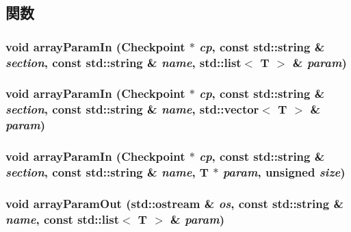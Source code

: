 \subsection{関数}
\hypertarget{serialize_8hh_ae46dcc0ec3ac204a89456a1aad4c9527}{
\subsubsection[{arrayParamIn}]{\setlength{\rightskip}{0pt plus 5cm}void arrayParamIn ({\bf Checkpoint} $\ast$ {\em cp}, \/  const std::string \& {\em section}, \/  const std::string \& {\em name}, \/  {\bf std::list}$<$ T $>$ \& {\em param})}}
\label{serialize_8hh_ae46dcc0ec3ac204a89456a1aad4c9527}
\hypertarget{serialize_8hh_ae1d6ca928c9be8b949b8e0451032c261}{
\subsubsection[{arrayParamIn}]{\setlength{\rightskip}{0pt plus 5cm}void arrayParamIn ({\bf Checkpoint} $\ast$ {\em cp}, \/  const std::string \& {\em section}, \/  const std::string \& {\em name}, \/  {\bf std::vector}$<$ T $>$ \& {\em param})}}
\label{serialize_8hh_ae1d6ca928c9be8b949b8e0451032c261}
\hypertarget{serialize_8hh_a6b947efbd6a4ceb6ed5a1c79898fa287}{
\subsubsection[{arrayParamIn}]{\setlength{\rightskip}{0pt plus 5cm}void arrayParamIn ({\bf Checkpoint} $\ast$ {\em cp}, \/  const std::string \& {\em section}, \/  const std::string \& {\em name}, \/  T $\ast$ {\em param}, \/  unsigned {\em size})}}
\label{serialize_8hh_a6b947efbd6a4ceb6ed5a1c79898fa287}
\hypertarget{serialize_8hh_a654936204c92d2f02a31f2962c0525d0}{
\subsubsection[{arrayParamOut}]{\setlength{\rightskip}{0pt plus 5cm}void arrayParamOut (std::ostream \& {\em os}, \/  const std::string \& {\em name}, \/  const {\bf std::list}$<$ T $>$ \& {\em param})}}
